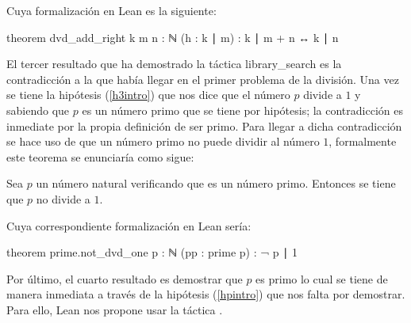 Cuya formalización en Lean es la siguiente:
\begin{leancode}
theorem dvd_add_right {k m n : ℕ} (h : k ∣ m) : k ∣ m + n ↔ k ∣ n
\end{leancode}

El tercer resultado que ha demostrado la táctica
 {library\_search} es la contradicción a la que
había llegar en el primer problema de la división. Una vez se tiene la
hipótesis (\ref{h3intro}) que nos dice que el número \(p\) divide a
\(1\) y sabiendo que \(p\) es un número primo que se tiene por
hipótesis; la contradicción es inmediate por la propia definición de ser
primo. Para llegar a dicha contradicción se hace uso de que un número
primo no puede dividir al número \(1\), formalmente este teorema se enunciaría
como sigue:
\begin{teorema}
  Sea \(p\) un número natural verificando que es un número primo. Entonces
  se tiene que \(p\) no divide a \(1\).
\end{teorema}
Cuya correspondiente formalización en Lean sería:
\begin{leancode}
theorem prime.not_dvd_one {p : ℕ} (pp : prime p) : ¬ p ∣ 1
\end{leancode}

Por último, el cuarto resultado es demostrar que \(p\) es primo lo cual
se tiene de manera inmediata a través de la hipótesis (\ref{hpintro}) que nos
falta por demostrar.  Para ello, Lean nos propone usar la táctica
.

